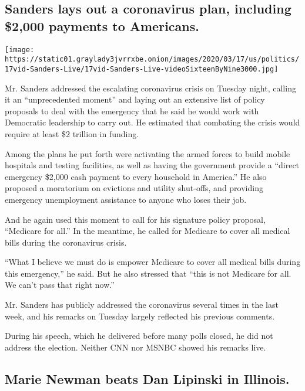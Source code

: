 \hypertarget{sanders-lays-out-a-coronavirus-plan-including-2000-payments-to-americans}{%
\subsection{Sanders lays out a coronavirus plan, including \$2,000
payments to
Americans.}\label{sanders-lays-out-a-coronavirus-plan-including-2000-payments-to-americans}}

\texttt{[image: https://static01.graylady3jvrrxbe.onion/images/2020/03/17/us/politics/17vid-Sanders-Live/17vid-Sanders-Live-videoSixteenByNine3000.jpg]}

Mr. Sanders addressed the escalating coronavirus crisis on Tuesday
night, calling it an ``unprecedented moment'' and laying out an
extensive list of policy proposals to deal with the emergency that he
said he would work with Democratic leadership to carry out. He estimated
that combating the crisis would require at least \$2 trillion in
funding.

Among the plans he put forth were activating the armed forces to build
mobile hospitals and testing facilities, as well as having the
government provide a ``direct emergency \$2,000 cash payment to every
household in America.'' He also proposed a moratorium on evictions and
utility shut-offs, and providing emergency unemployment assistance to
anyone who loses their job.

And he again used this moment to call for his signature policy proposal,
``Medicare for all.'' In the meantime, he called for Medicare to cover
all medical bills during the coronavirus crisis.

``What I believe we must do is empower Medicare to cover all medical
bills during this emergency,'' he said. But he also stressed that ``this
is not Medicare for all. We can't pass that right now.''

Mr. Sanders has publicly addressed the coronavirus several times in the
last week, and his remarks on Tuesday largely reflected his previous
comments.

During his speech, which he delivered before many polls closed, he did
not address the election. Neither CNN nor MSNBC showed his remarks live.

\hypertarget{marie-newman-beats-dan-lipinski-in-illinois}{%
\subsection{Marie Newman beats Dan Lipinski in
Illinois.}\label{marie-newman-beats-dan-lipinski-in-illinois}}

